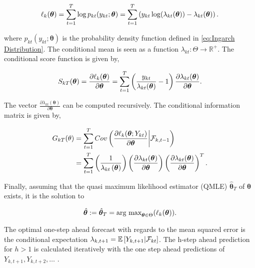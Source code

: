 \begin{equation}
\ell_k(\bm{\theta}) = \sum_{t=1}^T\log p_{kt}(y_{kt};\bm{\theta}) = \sum_{t=1}^T \left(y_{kt}\log(\lambda_{kt}(\bm{\theta})) - \lambda_{kt}(\bm{\theta})\right).
\label{eq: Quasi log likelihood}
\end{equation}

where $p_{kt}(y_{kt};\bm{\theta})$ is the probability density function defined in \ref{eq:Ingarch Distribution}. The conditional mean is seen as a function $\lambda_{kt}: \Theta \rightarrow \mathbb{R}^{+}$. The conditional score function is given by,

\begin{equation}
S_{kT}(\bm{\theta}) = \frac{\partial \ell_k(\bm{\theta})}{\partial \bm{\theta}} = \sum_{t=1}^T\left(\frac{y_{kt}}{\lambda_{kt}(\bm{\theta})}-1\right)\frac{\partial\lambda_{kt}(\bm{\theta})}{\partial \bm{\theta}}.
\label{eq:conditional score}
\end{equation}

The vector $\frac{\partial\lambda_{kt}(\bm{\theta})}{\partial \bm{\theta}}$ can be computed recursively. 
The conditional information matrix is given by, 

\begin{align}
G_{kT}(\theta) &= \sum_{t=1}^T Cov\left(\frac{\partial \ell_k(\bm{\theta}; Y_{kt})}{\partial \bm{\theta}} \middle| \mathcal{F}_{k,t-1}\right) \\
&=  \sum_{t=1}^T \left(\frac{1}{\lambda_{kt}\left(\bm{\theta}\right)}\right) \left(\frac{\partial \lambda_{kt}(\bm{\theta})}{\partial \bm{\theta}}\right)\left(\frac{\partial \lambda_{kt}(\bm{\theta})}{\partial \bm{\theta}}\right)^T.
\label{eq:conditional information matrix}
\end{align}

Finally, assuming that the quasi maximum likelihood estimator (QMLE) $\hat{\bm{\theta}}_T$ of $\bm{\theta}$ exists, it is the solution to 

\begin{equation}
\hat{\bm{\theta}}:= \hat{\bm{\theta}}_T = \text{arg max}_{\bm{\theta} \in \Theta} (\ell_k(\bm{\theta})). 
\label{eq:ingarch qmle}
\end{equation}

The optimal one-step ahead forecast with regards to the mean squared error is the conditional expectation $\lambda_{k,t+1}=\mathbb{E}\left[Y_{k,t+1} | \mathcal{F}_{kt} \right]$. The h-step ahead prediction for $h>1$ is calculated iteratively with the one step ahead predictions of $Y_{k,t+1},Y_{k,t+2},\ldots$ \cite{Liboschik:2016}. 


